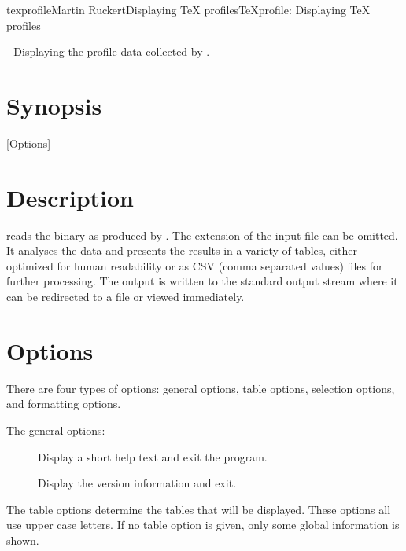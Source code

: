 \documentclass[a4paper,english]{article}
\begin{document}
\begin{Name}{1}{texprofile}{Martin Ruckert}{Displaying TeX profiles}{TeXprofile: Displaying TeX profiles}
  
   - Displaying the profile data collected by .
\end{Name}

\section{Synopsis}

 [Options] 

\section{Description}
 reads the binary  as produced by
.  The extension  of the input file can be
omitted. It analyses the data and presents the results in a variety of
tables, either optimized for human readability or as CSV (comma
separated values) files for further processing.
The output is written to the standard output stream where it can be redirected
to a file or viewed immediately.

\section{Options}
There are four types of options: general options, table options, selection options, and formatting options.

The general options:
\begin{description}
\item[  ]
  Display a short help text and exit the program.
\item[]
  Display the version information and exit.
\end{description}

The table options determine the tables that will be displayed.
These options all use upper case letters.
If no table option is given, only some global information is shown.
\end{document}
